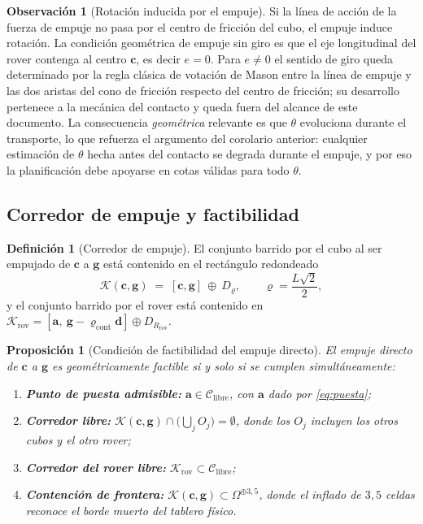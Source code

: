 \documentclass[11pt,a4paper]{article}
\newtheorem{proposicion}[teorema]{Proposición}
\theoremstyle{definition}
\newtheorem{definicion}[teorema]{Definición}
\newtheorem{observacion}[teorema]{Observación}
\newcommand{\dd}{\mathbf{d}}
\newcommand{\cc}{\mathbf{c}}
\newcommand{\gv}{\mathbf{g}}
\newcommand{\aaa}{\mathbf{a}}
\begin{document}
\begin{observacion}[Rotación inducida por el empuje]
Si la línea de acción de la fuerza de empuje no pasa por el centro de fricción del cubo,
el empuje induce rotación. La condición geométrica de empuje sin giro es que el eje
longitudinal del rover contenga al centro $\cc$, es decir $e = 0$. Para $e \ne 0$ el
sentido de giro queda determinado por la regla clásica de votación de Mason entre la
línea de empuje y las dos aristas del cono de fricción respecto del centro de fricción;
su desarrollo pertenece a la mecánica del contacto y queda fuera del alcance de este
documento. La consecuencia \emph{geométrica} relevante es que $\theta$ evoluciona
durante el transporte, lo que refuerza el argumento del corolario anterior: cualquier
estimación de $\theta$ hecha antes del contacto se degrada durante el empuje, y por eso
la planificación debe apoyarse en cotas válidas para todo $\theta$.
\end{observacion}

\subsection{Corredor de empuje y factibilidad}

\begin{definicion}[Corredor de empuje]
El conjunto barrido por el cubo al ser empujado de $\cc$ a $\gv$ está contenido en el
rectángulo redondeado
\begin{equation}
  \mathcal K(\cc,\gv) \;=\; [\cc,\gv]\ \oplus\ D_{\varrho}, \qquad \varrho = \frac{L\sqrt2}{2},
  \label{eq:corredor}
\end{equation}
y el conjunto barrido por el rover está contenido en
$\mathcal K_{\mathrm{rov}} = [\aaa,\ \gv - \varrho_{\mathrm{cont}}\dd] \oplus D_{R_{\mathrm{rov}}}$.
\end{definicion}

\begin{proposicion}[Condición de factibilidad del empuje directo]
\label{prop:factible}
El empuje directo de $\cc$ a $\gv$ es geométricamente factible si y solo si se cumplen
simultáneamente:
\begin{enumerate}[label=(F\arabic*),leftmargin=3em,itemsep=2pt]
\item \textbf{Punto de puesta admisible:} $\aaa \in \mathcal C_{\mathrm{libre}}$, con
      $\aaa$ dado por \eqref{eq:puesta};
\item \textbf{Corredor libre:} $\mathcal K(\cc,\gv) \cap \big(\bigcup_j O_j\big) = \emptyset$,
      donde los $O_j$ incluyen los otros cubos y el otro rover;
\item \textbf{Corredor del rover libre:} $\mathcal K_{\mathrm{rov}} \subset \mathcal C_{\mathrm{libre}}$;
\item \textbf{Contención de frontera:} $\mathcal K(\cc,\gv) \subset \Omega^{\oplus 3{,}5}$,
      donde el inflado de $3{,}5$ celdas reconoce el borde muerto del tablero físico.
\end{enumerate}
\end{proposicion}
\end{document}
